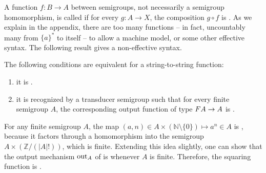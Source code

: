 \AP A function $f\colon B \to A$ between semigroups, not necessarily a semigroup
homomorphism, is called  if for every
 $g\colon A \to X$, the composition $g \circ f$ is
. As we explain in the appendix, there are too many  functions -- in fact, uncountably many from $\{a\}^*$ to itself -- to
allow a machine model, or some other effective syntax. The following result
gives a non-effective syntax.

\begin{theorem}\label{thm:reco-reflecting-functions} The following conditions are equivalent for a string-to-string function:
 \begin{enumerate}
 \item \label{it:reco-refl} it is .
 \item \label{it:trans-semig-reco}it is recognized by a transducer semigroup such that for every finite semigroup $A$, the corresponding output function of type 
 $\functor A \to A$
 is .
 \end{enumerate}
\end{theorem}
\begin{example}\label{ex:squaring-reco-refl}
  For any finite semigroup $A$, the map $(a,n) \in A \times (\mathbb{N}\setminus\{0\}) \mapsto a^n \in A$ is , because it factors through a homomorphism into the semigroup $A \times (\mathbb{Z}/(|A|!))$, which is finite. Extending this idea slightly, one can show that the output mechanism $\mathrm{out}_A$ of  is  whenever $A$ is finite. Therefore, the squaring function is .
\end{example}
